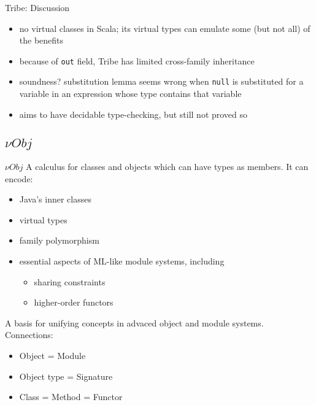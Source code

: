 \documentclass{beamer}
\begin{document}
\begin{frame}{Tribe: Discussion}
\begin{itemize}
\item no virtual classes in Scala; its virtual types can emulate some (but not all) of the benefits
\item because of {\tt out} field, Tribe has limited cross-family inheritance
\item soundness? substitution lemma seems wrong when {\tt null} is
  substituted for a variable in an expression whose type contains
  that variable
\item aims to have decidable type-checking, but still not proved so
\end{itemize}
\end{frame}


\subsection{${\nu}Obj$}

\begin{frame}{${\nu}Obj$}
A calculus for classes and objects which can have types as members. It can encode:
\begin{itemize}
\item Java's inner classes
\item virtual types
\item family polymorphism
\item essential aspects of ML-like module systems, including
\begin{itemize}
\item sharing constraints
\item higher-order functors
\end{itemize}
\end{itemize}
A basis for unifying concepts  in advaced object and module systems. Connections:
\begin{itemize}
\item Object = Module
\item Object type = Signature
\item Class = Method = Functor
\end{itemize}
\end{frame}
\end{document}
